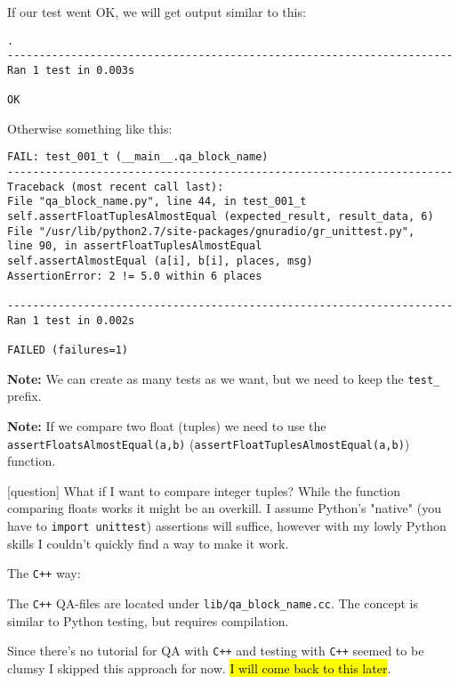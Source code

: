 \documentclass{article}
\begin{document}
If our test went OK, we will get output similar to this:

\begin{verbatim}
.
----------------------------------------------------------------------
Ran 1 test in 0.003s

OK
\end{verbatim}

Otherwise something like this:

\begin{verbatim}
FAIL: test_001_t (__main__.qa_block_name)
----------------------------------------------------------------------
Traceback (most recent call last):
File "qa_block_name.py", line 44, in test_001_t
self.assertFloatTuplesAlmostEqual (expected_result, result_data, 6)
File "/usr/lib/python2.7/site-packages/gnuradio/gr_unittest.py", 
line 90, in assertFloatTuplesAlmostEqual
self.assertAlmostEqual (a[i], b[i], places, msg)
AssertionError: 2 != 5.0 within 6 places

----------------------------------------------------------------------
Ran 1 test in 0.002s

FAILED (failures=1)
\end{verbatim}

\textbf{Note:} We can create as many tests as we want, but we need to keep the \verb|test_| prefix.

\bigskip

\textbf{Note:} If we compare two float (tuples) we need to use the \verb|assertFloatsAlmostEqual(a,b)| (\verb|assertFloatTuplesAlmostEqual(a,b)|) function. 

\bigskip

\color{blue}
[question] What if I want to compare integer tuples? While the function comparing floats works it might be an overkill. I assume Python's "native" (you have to \texttt{import unittest}) assertions will suffice, however with my lowly Python skills I couldn't quickly find a way to make it work. 
\color{black}

\bigskip

The \texttt{C++} way:

\bigskip

The \texttt{C++} QA-files are located under  \verb|lib/qa_block_name.cc|. The concept is similar to Python testing, but requires compilation. 

\bigskip

Since there's no tutorial for QA with \texttt{C++} and testing with \texttt{C++} seemed to be clumsy I skipped this approach for now. \hl{I will come back to this later}.
\end{document}
